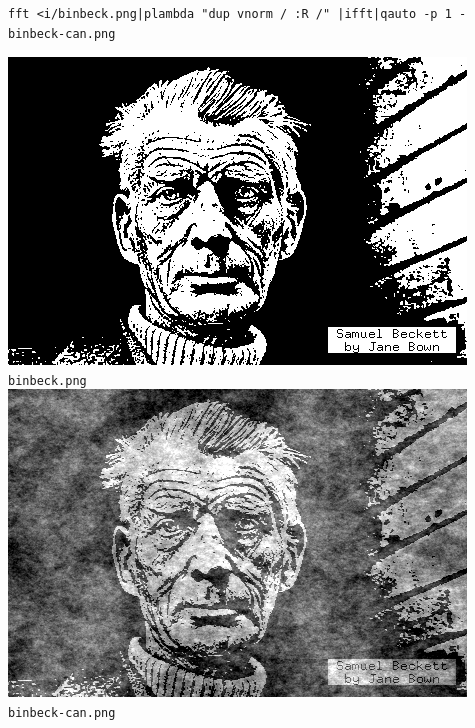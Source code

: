 \begin{verbatim}
fft <i/binbeck.png|plambda "dup vnorm / :R /" |ifft|qauto -p 1 - binbeck-can.png
\end{verbatim}
\includegraphics{i/binbeck.png}{\small\tt binbeck.png}\\
\includegraphics{binbeck-can.png}{\small\tt binbeck-can.png}




